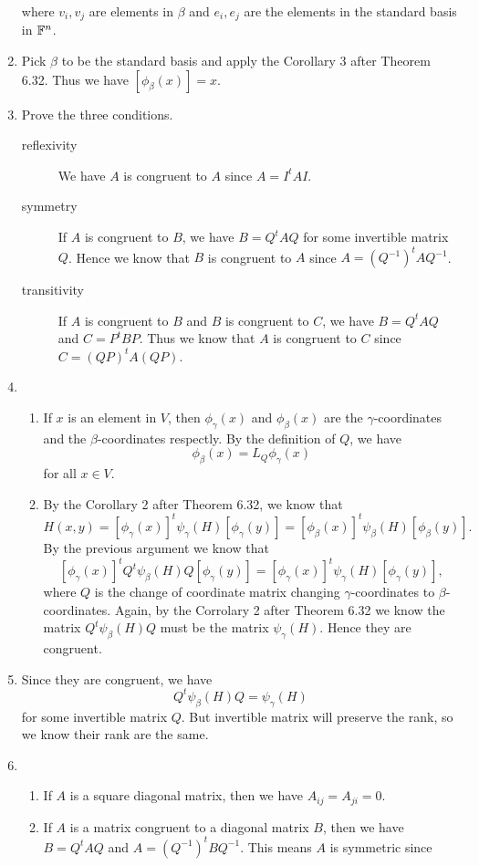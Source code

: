 \begin{enumerate}
where $v_i,v_j$ are elements in $\beta$ and $e_i,e_j$ are the elements in the standard basis in $\mathbb{F}^n$.
\item Pick $\beta $ to be the standard basis and apply the Corollary 3 after Theorem 6.32. Thus we have $[\phi_{\beta}(x)]=x$.
\item Prove the three conditions.
\begin{description}
\item[reflexivity] We have $A$ is congruent to $A$ since $A=I^tAI$.
\item[symmetry] If $A$ is congruent to $B$, we have $B=Q^tAQ$ for some invertible matrix $Q$. Hence we know that $B$ is congruent to $A$ since $A=(Q^{-1})^tAQ^{-1}$.
\item[transitivity] If $A$ is congruent to $B$ and $B$ is congruent to $C$, we have $B=Q^tAQ$ and $C=P^tBP$. Thus we know that $A$ is congruent to $C$ since $C=(QP)^tA(QP)$.
\end{description}
\item \begin{enumerate}
\item If $x$ is an element in $V$, then $\phi_{\gamma}(x)$ and $\phi_{\beta}(x)$ are the $\gamma$-coordinates and the $\beta $-coordinates respectly. By the definition of $Q$, we have 
\[\phi_{\beta}(x)=L_Q\phi_{\gamma}(x)\]
for all $x\in V$.
\item By the Corollary 2 after Theorem 6.32, we know that 
\[H(x,y)=[\phi_{\gamma}(x)]^t\psi_{\gamma}(H)[\phi_{\gamma}(y)]=[\phi_{\beta}(x)]^t\psi_{\beta}(H)[\phi_{\beta}(y)].\]
By the previous argument we know that 
\[[\phi_{\gamma}(x)]^tQ^t\psi_{\beta}(H)Q[\phi_{\gamma}(y)]=[\phi_{\gamma}(x)]^t\psi_{\gamma}(H)[\phi_{\gamma}(y)],\]
where $Q$ is the change of coordinate matrix changing $\gamma $-coordinates to $\beta$-coordinates. Again, by the Corrolary 2 after Theorem 6.32 we know the matrix $Q^t\psi_{\beta}(H)Q$ must be the matrix $\psi_{\gamma}(H)$. Hence they are congruent.
\end{enumerate}
\item Since they are congruent, we have 
\[Q^t\psi_{\beta}(H)Q=\psi_{\gamma}(H)\]
for some invertible matrix $Q$. But invertible matrix will preserve the rank, so we know their rank are the same.
\item \begin{enumerate}
\item If $A$ is a square diagonal matrix, then we have $A_{ij}=A_{ji}=0$.
\item If $A$ is a matrix congruent to a diagonal matrix $B$, then we have $B=Q^tAQ$ and $A=(Q^{-1})^tBQ^{-1}$. This means $A$ is symmetric since 

\end{enumerate}
\end{enumerate}
